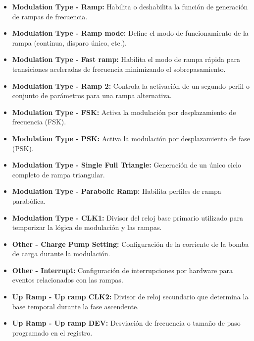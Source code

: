 \begin{itemize}
    \item \textbf{Modulation Type - Ramp:} Habilita o deshabilita la función de generación de rampas de frecuencia.
    
    \item \textbf{Modulation Type - Ramp mode:} Define el modo de funcionamiento de la rampa (continua, disparo único, etc.).
    
    \item \textbf{Modulation Type - Fast ramp:} Habilita el modo de rampa rápida para transiciones aceleradas de frecuencia minimizando el sobrepasamiento.
    
    \item \textbf{Modulation Type - Ramp 2:} Controla la activación de un segundo perfil o conjunto de parámetros para una rampa alternativa.
    
    \item \textbf{Modulation Type - FSK:} Activa la modulación por desplazamiento de frecuencia (FSK).
    
    \item \textbf{Modulation Type - PSK:} Activa la modulación por desplazamiento de fase (PSK).
    
    \item \textbf{Modulation Type - Single Full Triangle:} Generación de un único ciclo completo de rampa triangular.
    
    \item \textbf{Modulation Type - Parabolic Ramp:} Habilita perfiles de rampa parabólica.
    
    \item \textbf{Modulation Type - CLK1:} Divisor del reloj base primario utilizado para temporizar la lógica de modulación y las rampas.
    
    \item \textbf{Other - Charge Pump Setting:} Configuración de la corriente de la bomba de carga durante la modulación.
    
    \item \textbf{Other - Interrupt:} Configuración de interrupciones por hardware para eventos relacionados con las rampas.
    
    \item \textbf{Up Ramp - Up ramp CLK2:} Divisor de reloj secundario que determina la base temporal durante la fase ascendente.
    
    \item \textbf{Up Ramp - Up ramp DEV:} Desviación de frecuencia o tamaño de paso programado en el registro.
    

\end{itemize}
